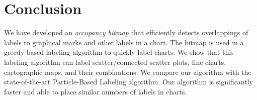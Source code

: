 \section{Conclusion}

We have developed an \emph{occupancy bitmap} that efficiently detects overlappings of labels to graphical marks and other labels in a chart.
The bitmap is used in a greedy-based labeling algorithm to quickly label charts.
We show that this labeling algorithm can label scatter/connected scatter plots, line charts, cartographic maps, and their combinations.
We compare our algorithm with the state-of-the-art Particle-Based Labeling algorithm.
Our algorithm is significantly faster and able to place similar numbers of labels in charts.